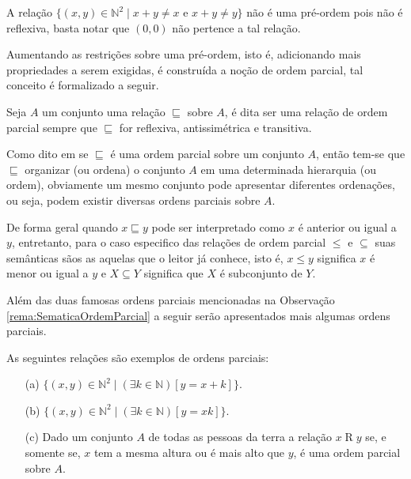 \begin{example}
	A relação $\{(x, y) \in \mathbb{N}^2 \mid x + y \neq x \text{ e } x + y \neq y\}$ não é uma pré-ordem pois não é reflexiva, basta notar que $(0,0)$ não pertence a tal relação.
\end{example}

Aumentando as restrições sobre uma pré-ordem, isto é, adicionando mais propriedades a serem exigidas, é construída a noção de ordem parcial, tal conceito é formalizado a seguir. 

\begin{definition}\label{def:OrdemParcial}
	Seja $A$ um conjunto uma relação $\sqsubseteq$ sobre $A$, é dita ser uma relação de ordem parcial sempre que $\sqsubseteq$ for reflexiva, antissimétrica e transitiva.
\end{definition}

Como dito em \cite{abe1991-TC} se $\sqsubseteq$ é uma ordem parcial sobre um conjunto $A$, então tem-se que $\sqsubseteq$ organizar (ou ordena) o conjunto $A$ em uma determinada hierarquia (ou ordem), obviamente um mesmo conjunto pode apresentar diferentes ordenações, ou seja, podem existir diversas ordens parciais sobre $A$.

\begin{remark}\label{rema:SematicaOrdemParcial}
	De forma geral quando $x \sqsubseteq y$ pode ser interpretado como $x$ é anterior ou igual a $y$, entretanto, para o caso especifico das relações de ordem parcial $\leq$ e $\subseteq$ suas semânticas sãos as aquelas que o leitor já conhece, isto é, $x \leq y$ significa $x$ é menor ou igual a $y$ e $X \subseteq Y$ significa que $X$ é subconjunto de $Y$.
\end{remark}

Além das duas famosas ordens parciais mencionadas na Observação \ref{rema:SematicaOrdemParcial} a seguir serão apresentados mais algumas ordens parciais.

\begin{example}\label{exe:OrdemParcialSimples}
	As seguintes relações são exemplos de ordens parciais:
	\begin{itemize}
		\item[(a)] $\{(x, y) \in \mathbb{N}^2 \mid (\exists k \in \mathbb{N})[y = x + k]\}$.
		\item[(b)] $\{(x, y) \in \mathbb{N}^2 \mid (\exists k \in \mathbb{N})[y = xk]\}$.
		\item[(c)] Dado um conjunto $A$ de todas as pessoas da terra a relação $x \mathrel{R} y$ se, e somente se, $x$ tem a mesma altura ou é mais alto que $y$, é uma ordem parcial sobre $A$.
	\end{itemize}
\end{example}

